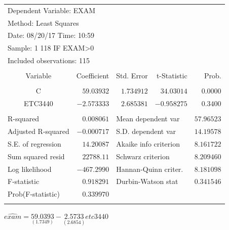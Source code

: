 \documentclass[12pt]{report}
\begin{document}
\begin{table}[H]
	\centering
	\begin{tabular}{lrrrr}
		\multicolumn{3}{l}{Dependent Variable: EXAM}&\multicolumn{1}{c}{}&\multicolumn{1}{c}{}\\
		\multicolumn{3}{l}{Method: Least Squares}&\multicolumn{1}{c}{}&\multicolumn{1}{c}{}\\
		\multicolumn{3}{l}{Date: 08/20/17   Time: 10:59}&\multicolumn{1}{c}{}&\multicolumn{1}{c}{}\\
		\multicolumn{3}{l}{Sample: 1 118 IF EXAM\textgreater 0}&\multicolumn{1}{c}{}&\multicolumn{1}{c}{}\\
		\multicolumn{3}{l}{Included observations: 115}&\multicolumn{1}{c}{}&\multicolumn{1}{c}{}\\
		[4.5pt] \hline \\ [-4.5pt]
		\multicolumn{1}{c}{Variable}&\multicolumn{1}{r}{Coefficient}&\multicolumn{1}{r}{Std. Error}&\multicolumn{1}{r}{t-Statistic}&\multicolumn{1}{r}{Prob.}\\
		[4.5pt] \hline \\ [-4.5pt]
		\multicolumn{1}{c}{C}&\multicolumn{1}{r}{$59.03932$}&\multicolumn{1}{r}{$1.734912$}&\multicolumn{1}{r}{$34.03014$}&\multicolumn{1}{r}{$0.0000$}\\
		\multicolumn{1}{c}{ETC3440}&\multicolumn{1}{r}{$-2.573333$}&\multicolumn{1}{r}{$2.685381$}&\multicolumn{1}{r}{$-0.958275$}&\multicolumn{1}{r}{$0.3400$}\\
		[4.5pt] \hline \\ [-4.5pt]
		\multicolumn{1}{l}{R-squared}&\multicolumn{1}{r}{$0.008061$}&\multicolumn{2}{l}{Mean dependent var}&\multicolumn{1}{r}{$57.96523$}\\
		\multicolumn{1}{l}{Adjusted R-squared}&\multicolumn{1}{r}{$-0.000717$}&\multicolumn{2}{l}{S.D. dependent var}&\multicolumn{1}{r}{$14.19578$}\\
		\multicolumn{1}{l}{S.E. of regression}&\multicolumn{1}{r}{$14.20087$}&\multicolumn{2}{l}{Akaike info criterion}&\multicolumn{1}{r}{$8.161722$}\\
		\multicolumn{1}{l}{Sum squared resid}&\multicolumn{1}{r}{$22788.11$}&\multicolumn{2}{l}{Schwarz criterion}&\multicolumn{1}{r}{$8.209460$}\\
		\multicolumn{1}{l}{Log likelihood}&\multicolumn{1}{r}{$-467.2990$}&\multicolumn{2}{l}{Hannan-Quinn criter.}&\multicolumn{1}{r}{$8.181098$}\\
		\multicolumn{1}{l}{F-statistic}&\multicolumn{1}{r}{$0.918291$}&\multicolumn{2}{l}{Durbin-Watson stat}&\multicolumn{1}{r}{$0.341546$}\\
		\multicolumn{1}{l}{Prob(F-statistic)}&\multicolumn{1}{r}{$0.339970$}&\multicolumn{1}{c}{}&\multicolumn{1}{c}{}&\multicolumn{1}{c}{}\\
		[4.5pt] \hline \\ [-4.5pt]
	\end{tabular}
\end{table}
\vspace{-\baselineskip} \centering$\widehat{exam} = \underset{(1.7349)}{59.0393} - \underset{(2.6854)}{2.5733}etc3440$
\end{document}

